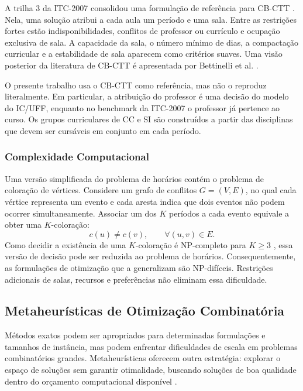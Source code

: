 A trilha 3 da ITC-2007 consolidou uma formulação de referência para CB-CTT \cite{digaspero2007itc}. Nela, uma solução atribui a cada aula um período e uma sala. Entre as restrições fortes estão indisponibilidades, conflitos de professor ou currículo e ocupação exclusiva de sala. A capacidade da sala, o número mínimo de dias, a compactação curricular e a estabilidade de sala aparecem como critérios suaves. Uma visão posterior da literatura de CB-CTT é apresentada por Bettinelli et al. \cite{bettinelli2015overview}.

O presente trabalho usa o CB-CTT como referência, mas não o reproduz literalmente. Em particular, a atribuição do professor é uma decisão do modelo do IC/UFF, enquanto no benchmark da ITC-2007 o professor já pertence ao curso. Os grupos curriculares de CC e SI são construídos a partir das disciplinas que devem ser cursáveis em conjunto em cada período. 

\subsubsection{Complexidade Computacional}

Uma versão simplificada do problema de horários contém o problema de coloração de vértices. Considere um grafo de conflitos $G=(V,E)$, no qual cada vértice representa um evento e cada aresta indica que dois eventos não podem ocorrer simultaneamente. Associar um dos $K$ períodos a cada evento equivale a obter uma $K$-coloração:
\begin{equation}
    c(u) \neq c(v), \qquad \forall (u,v)\in E.
\end{equation}
Como decidir a existência de uma $K$-coloração é NP-completo para $K\geq 3$ \cite{garey1979computers}, essa versão de decisão pode ser reduzida ao problema de horários. Consequentemente, as formulações de otimização que a generalizam são NP-difíceis. Restrições adicionais de salas, recursos e preferências não eliminam essa dificuldade.

\subsection{Metaheurísticas de Otimização Combinatória}
\label{subsec:metaheuristicas_teoria}

Métodos exatos podem ser apropriados para determinadas formulações e tamanhos de instância, mas podem enfrentar dificuldades de escala em problemas combinatórios grandes. Metaheurísticas oferecem outra estratégia: explorar o espaço de soluções sem garantir otimalidade, buscando soluções de boa qualidade dentro do orçamento computacional disponível \cite{talbi2009metaheuristics}.

